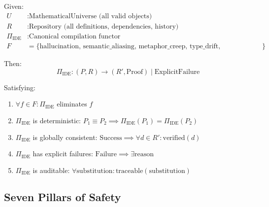\documentclass[12pt]{article}
\begin{document}
\begin{theorem}
Given:
\begin{align*}
    U & : \text{MathematicalUniverse (all valid objects)} \\
    R & : \text{Repository (all definitions, dependencies, history)} \\
    \Pi_{\text{IDE}} & : \text{Canonical compilation functor} \\
    F & = \{\text{hallucination, semantic\_aliasing, metaphor\_creep, type\_drift, cross\_domain\_contamination}\}
\end{align*}

Then:
\[
\Pi_{\text{IDE}} : (P, R) \rightarrow (R', \text{Proof}) \mid \text{ExplicitFailure}
\]

Satisfying:
\begin{enumerate}
    \item $\forall f \in F: \Pi_{\text{IDE}}$ eliminates $f$
    \item $\Pi_{\text{IDE}}$ is deterministic: $P_1 \equiv P_2 \implies \Pi_{\text{IDE}}(P_1) = \Pi_{\text{IDE}}(P_2)$
    \item $\Pi_{\text{IDE}}$ is globally consistent: $\text{Success} \implies \forall d \in R': \text{verified}(d)$
    \item $\Pi_{\text{IDE}}$ has explicit failures: $\text{Failure} \implies \exists \text{reason}$
    \item $\Pi_{\text{IDE}}$ is auditable: $\forall \text{substitution}: \text{traceable}(\text{substitution})$
\end{enumerate}
\end{theorem}

\subsection{Seven Pillars of Safety}
\end{document}

